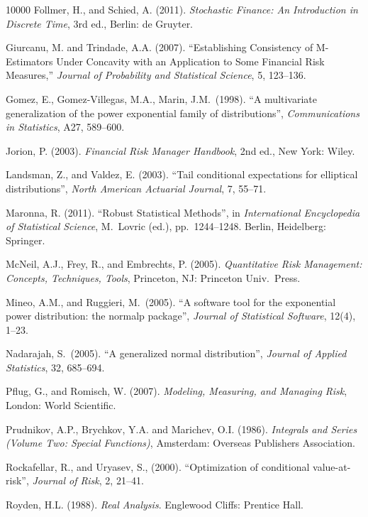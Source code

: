 \documentclass[11pt]{article}
\newcommand{\nc}{\normalcolor}
\begin{document}
\begin{thebibliography}{10000}
Follmer, H., and Schied, A. (2011). \emph{Stochastic Finance: An Introduction in Discrete
Time}, 3rd ed., Berlin: de Gruyter.

 Giurcanu, M. and Trindade, A.A. (2007). ``Establishing Consistency of M-Estimators Under Concavity with an Application to Some Financial Risk Measures,'' \emph{Journal of Probability and Statistical Science}, 5, 123--136.

 Gomez, E., Gomez-Villegas, M.A., Marin, J.M.~(1998). ``A
multivariate generalization of the power exponential family of
distributions'', \textit{Communications in Statistics}, A27, 589--600.

Jorion, P. (2003). \emph{Financial Risk Manager Handbook}, 2nd ed., New
York: Wiley.

Landsman, Z., and Valdez, E.  (2003). ``Tail conditional expectations for elliptical
distributions'', \emph{North American Actuarial Journal}, 7, 55--71.


Maronna, R. (2011). ``Robust Statistical Methods'', in \emph{International
Encyclopedia of Statistical Science}, M.~Lovric (ed.), pp.~1244--1248.
Berlin, Heidelberg: Springer. \nc

McNeil, A.J., Frey, R., and Embrechts, P. (2005). \emph{Quantitative
  Risk Management: Concepts, Techniques, Tools}, Princeton, NJ: Princeton Univ.~Press.

Mineo, A.M., and Ruggieri, M.~(2005). ``A software tool for the exponential power
distribution: the normalp package'', \emph{Journal of Statistical
  Software}, 12(4), 1--23.

Nadarajah, S.~(2005). ``A generalized normal distribution'',
\emph{Journal of Applied Statistics}, 32, 685--694.

Pflug, G., and Romisch, W. (2007). \emph{Modeling, Measuring, and Managing Risk},
London: World Scientific.

Prudnikov, A.P.,  Brychkov, Y.A. and Marichev, O.I. 
(1986). \emph{Integrals and Series (Volume Two: Special Functions)},
Amsterdam: Overseas Publishers Association. 

Rockafellar, R., and Uryasev, S., (2000). ``Optimization of
conditional value-at-risk'', \emph{Journal of Risk}, 2, 21--41.

Royden, H.L. (1988). \emph{Real Analysis}. Englewood Cliffs: Prentice Hall.\nc


\end{thebibliography}
\end{document}
